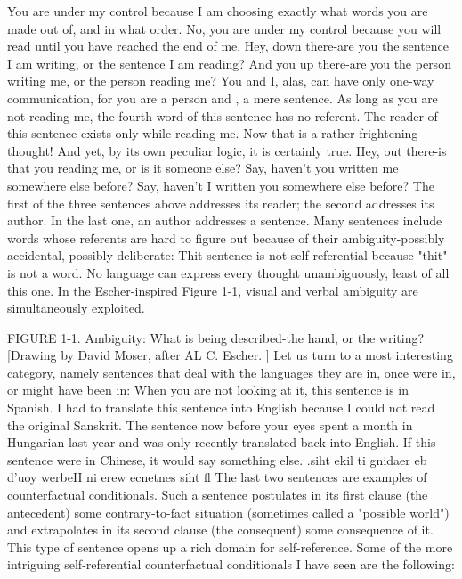 You are under my control because I am choosing exactly what words you are made out of, and in what order. 
No, you are under my control because you will read until you have reached the end of me. 
Hey, down there-are you the sentence I am writing, or the sentence I am reading? 
And you up there-are you the person writing me, or the person reading me? 
You and I, alas, can have only one-way communication, for you are a person and , a mere sentence. 
As long as you are not reading me, the fourth word of this sentence has no referent. 
The reader of this sentence exists only while reading me. 
Now that is a rather frightening thought! And yet, by its own peculiar logic, it is certainly true. 
Hey, out there-is that you reading me, or is it someone else? 
Say, haven't you written me somewhere else before? 
Say, haven't I written you somewhere else before? 
The first of the three sentences above addresses its reader; the second addresses its author. In the last one, an author addresses a sentence. Many sentences include words whose referents are hard to figure out because of their ambiguity-possibly accidental, possibly deliberate: 
Thit sentence is not self-referential because "thit" is not a word. 
No language can express every thought unambiguously, least of all this one. 
In the Escher-inspired Figure 1-1, visual and verbal ambiguity are simultaneously exploited. 
\separator




FIGURE 1-1. Ambiguity: What is being described-the hand, or the writing? [Drawing by David Moser, after AL C. Escher. ] 
Let us turn to a most interesting category, namely sentences that deal with the languages they are in, once were in, or might have been in: 
When you are not looking at it, this sentence is in Spanish. 
I had to translate this sentence into English because I could not read the original Sanskrit. 
The sentence now before your eyes spent a month in Hungarian last year and was only recently translated back into English. 
If this sentence were in Chinese, it would say something else. 
.siht ekil ti gnidaer eb d'uoy werbeH ni erew ecnetnes siht fl 
The last two sentences are examples of counterfactual conditionals. Such a sentence postulates in its first clause (the antecedent) some contrary-to-fact situation (sometimes called a "possible world") and extrapolates in its second clause (the consequent) some consequence of it. This type of sentence opens up a rich domain for self-reference. Some of the more intriguing self-referential counterfactual conditionals I have seen are the following: 



